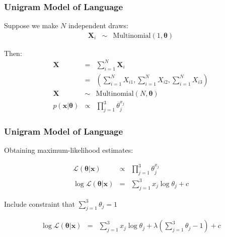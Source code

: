 \documentclass{beamer}
\numberwithin{equation}{section}
\begin{document}
\begin{frame}
\frametitle{Unigram Model of Language}

Suppose we make $N$ independent draws:
\begin{eqnarray}
\boldsymbol{X}_{i} & \sim & \text{Multinomial}(1, \boldsymbol{\theta})  \nonumber 
\end{eqnarray}

Then:
\begin{eqnarray}
\boldsymbol{X} & = &  \sum_{i=1}^{N}\boldsymbol{X}_{i} \nonumber \\
& = &   (\sum_{i=1}^{N} X_{i1}, \sum_{i=1}^{N}X_{i2}, \sum_{i=1}^{N} X_{i3} ) \nonumber \\
\boldsymbol{X} & \sim & \text{Multinomial}(N, \boldsymbol{\theta}) \nonumber \\
p(\boldsymbol{x}|\boldsymbol{\theta} ) & \propto & \prod_{j=1}^{3} \theta_{j}^{x_{j}} \nonumber 
\end{eqnarray}

\end{frame}

\begin{frame}
\frametitle{Unigram Model of Language}

Obtaining maximum-likelihood estimates:

\begin{eqnarray}
\mathcal{L}(\boldsymbol{\theta}| \boldsymbol{x} ) & \propto & \prod_{j=1}^{3} \theta_{j}^{x_{j} } \nonumber \\
\log \mathcal{L}(\boldsymbol{\theta}| \boldsymbol{x} ) & =  & \sum_{j=1}^{3} x_{j} \log \theta_{j} + c  \nonumber 
\end{eqnarray}

Include constraint that $\sum_{j=1}^{3} \theta_{j} = 1$ 

\begin{eqnarray}
\log \mathcal{L}(\boldsymbol{\theta}| \boldsymbol{x} ) & =  & \sum_{j=1}^{3} x_{j} \log \theta_{j} + \lambda(\sum_{j=1}^{3} \theta_{j} - 1)   + c\nonumber 
\end{eqnarray}



\end{frame}
\end{document}
